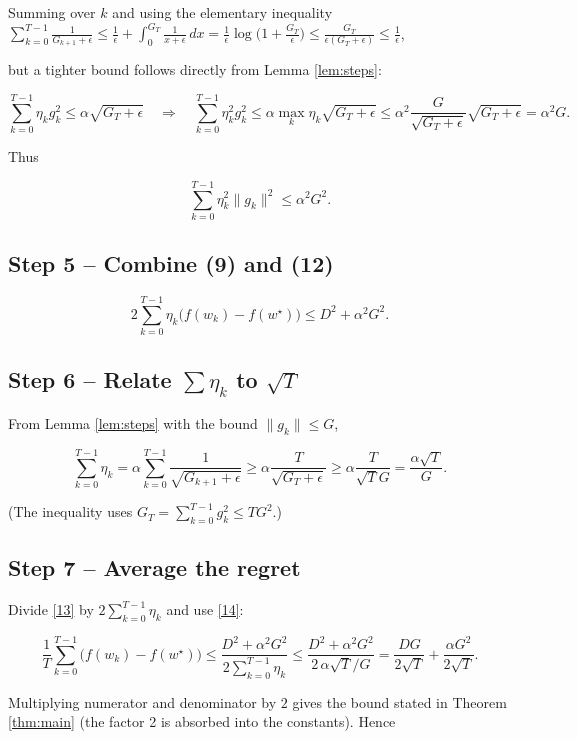 \documentclass{article}
\begin{document}
Summing over \(k\) and using the elementary inequality
\(\displaystyle\sum_{k=0}^{T-1}\frac{1}{G_{k+1}+\epsilon}
\le\frac{1}{\epsilon}+\int_{0}^{G_{T}}\frac{1}{x+\epsilon}\,dx
= \frac{1}{\epsilon}\log\!\bigl(1+\tfrac{G_{T}}{\epsilon}\bigr)\le\frac{G_{T}}{\epsilon (G_{T}+\epsilon)}\le\frac{1}{\epsilon}\),

but a tighter bound follows directly from Lemma \ref{lem:steps}:

\[
\sum_{k=0}^{T-1}\eta_{k}g_{k}^{2}
\le\alpha\sqrt{G_{T}+\epsilon}
\quad\Longrightarrow\quad
\sum_{k=0}^{T-1}\eta_{k}^{2}g_{k}^{2}
\le\alpha\max_{k}\eta_{k}\sqrt{G_{T}+\epsilon}
\le\alpha^{2}\frac{G}{\sqrt{G_{T}+\epsilon}}\sqrt{G_{T}+\epsilon}
= \alpha^{2}G .
\tag{11}
\]

Thus

\[
\sum_{k=0}^{T-1}\eta_{k}^{2}\|g_{k}\|^{2}
\le \alpha^{2}G^{2}.
\tag{12}
\]

\subsection*{Step 5 – Combine (9) and (12)}
\[
2\sum_{k=0}^{T-1}\eta_{k}\bigl(f(w_{k})-f(w^{\star})\bigr)
\le D^{2}+\alpha^{2}G^{2}.
\tag{13}
\]

\subsection*{Step 6 – Relate $\sum \eta_{k}$ to $\sqrt{T}$}
From Lemma \ref{lem:steps} with the bound \(\|g_{k}\|\le G\),

\[
\sum_{k=0}^{T-1}\eta_{k}
=
\alpha\sum_{k=0}^{T-1}\frac{1}{\sqrt{G_{k+1}+\epsilon}}
\ge
\alpha\frac{T}{\sqrt{G_{T}+\epsilon}}
\ge
\alpha\frac{T}{\sqrt{T}G}
=
\frac{\alpha\sqrt{T}}{G}.
\tag{14}
\]

(The inequality uses \(G_{T}=\sum_{k=0}^{T-1}g_{k}^{2}\le TG^{2}\).)

\subsection*{Step 7 – Average the regret}
Divide \eqref{13} by \(2\sum_{k=0}^{T-1}\eta_{k}\) and use \eqref{14}:

\[
\frac{1}{T}\sum_{k=0}^{T-1}\bigl(f(w_{k})-f(w^{\star})\bigr)
\le
\frac{D^{2}+\alpha^{2}G^{2}}{2\sum_{k=0}^{T-1}\eta_{k}}
\le
\frac{D^{2}+\alpha^{2}G^{2}}{2\,\alpha\sqrt{T}/G}
=
\frac{DG}{2\sqrt{T}}+\frac{\alpha G^{2}}{2\sqrt{T}} .
\tag{15}
\]

Multiplying numerator and denominator by \(2\) gives the bound stated in
Theorem \ref{thm:main} (the factor 2 is absorbed into the constants).  Hence
\end{document}
